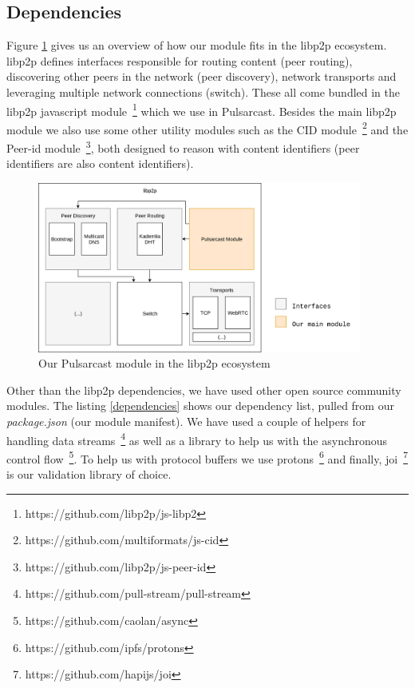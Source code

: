 \subsection{Dependencies}\label{subsec:dependencies}

Figure \ref{fig:pulsarcast-in-libp2p} gives us an overview of how our module
fits in the libp2p ecosystem. libp2p defines interfaces responsible for routing
content (peer routing), discovering other peers in the network (peer
discovery), network transports and leveraging multiple network connections
(switch). These all come bundled in the libp2p javascript
module~\footnote{https://github.com/libp2p/js-libp2} which we use in
Pulsarcast. Besides the main libp2p module we also use some other utility
modules such as the CID
module~\footnote{https://github.com/multiformats/js-cid} and the Peer-id
module~\footnote{https://github.com/libp2p/js-peer-id}, both designed to reason
with content identifiers (peer identifiers are also content identifiers). 

\begin{figure}[hb!]
  \centering
  \includegraphics[width=0.95\textwidth]{img/pulsarcast-in-libp2p.png}
  \caption{Our Pulsarcast module in the libp2p ecosystem}
  \label{fig:pulsarcast-in-libp2p}
\end{figure}

Other than the libp2p dependencies, we have used other open source community
modules. The listing \ref{dependencies} shows our dependency list, pulled from
our \emph{package.json} (our module manifest). We have used a couple of helpers
for handling data streams~\footnote{https://github.com/pull-stream/pull-stream}
as well as a library to help us with the asynchronous control
flow~\footnote{https://github.com/caolan/async}. To help us with protocol
buffers we use protons~\footnote{https://github.com/ipfs/protons} and finally,
joi~\footnote{https://github.com/hapijs/joi} is our validation library of
choice.

